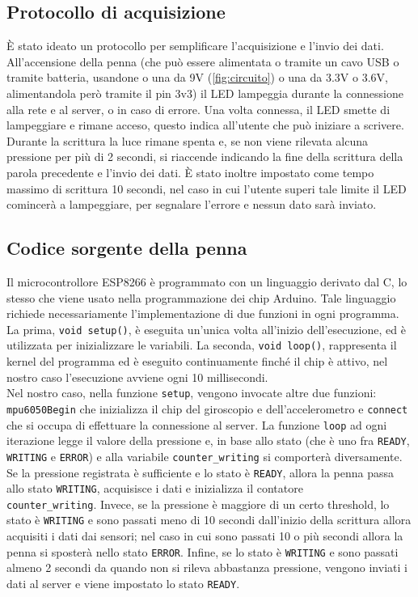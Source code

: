 \documentclass[8pt,notitlepage]{report}
\begin{document}
		\subsection{Protocollo di acquisizione}
			È stato ideato un protocollo per semplificare l'acquisizione e l'invio dei dati. All'accensione della penna (che può essere alimentata o tramite un cavo USB o tramite batteria, usandone o una da 9V (\cref{fig:circuito}) o una da 3.3V o 3.6V, alimentandola però tramite il pin 3v3) il LED lampeggia durante la connessione alla rete e al server, o in caso di errore. Una volta connessa, il LED smette di lampeggiare e rimane acceso, questo indica all'utente che può iniziare a scrivere. Durante la scrittura la luce rimane spenta e, se non viene rilevata alcuna pressione per più di 2 secondi, si riaccende indicando la fine della scrittura della parola precedente e l'invio dei dati. È stato inoltre impostato come tempo massimo di scrittura 10 secondi, nel caso in cui l'utente superi tale limite il LED comincerà a lampeggiare, per segnalare l'errore e nessun dato sarà inviato.
		
		\subsection{Codice sorgente della penna}
			Il microcontrollore ESP8266 è programmato con un linguaggio derivato dal C, lo stesso che viene usato nella programmazione dei chip Arduino. Tale linguaggio richiede necessariamente l'implementazione di due funzioni in ogni programma. \\
			La prima, \verb|void setup()|, è eseguita un'unica volta all'inizio dell'esecuzione, ed è utilizzata per inizializzare le variabili. La seconda, \verb|void loop()|, rappresenta il kernel del programma ed è eseguito continuamente finché il chip è attivo, nel nostro caso l'esecuzione avviene ogni 10 millisecondi. \\
			Nel nostro caso, nella funzione \verb|setup|, vengono invocate altre due funzioni: \verb|mpu6050Begin| che inizializza il chip del giroscopio e dell'accelerometro e \verb|connect| che si occupa di effettuare la connessione al server. La funzione \verb|loop| ad ogni iterazione legge il valore della pressione e, in base allo stato (che è uno fra \verb|READY|, \verb|WRITING| e \verb|ERROR|) e alla variabile \verb|counter_writing| si comporterà diversamente. \\ Se la pressione registrata è sufficiente e lo stato è \verb|READY|, allora la penna passa allo stato \verb|WRITING|, acquisisce i dati e inizializza il contatore \\ \verb|counter_writing|. Invece, se la pressione è maggiore di un certo threshold, lo stato è \verb|WRITING| e sono passati meno di 10 secondi dall'inizio della scrittura allora acquisiti i dati dai sensori; nel caso in cui sono passati 10 o più secondi allora la penna si sposterà nello stato \verb|ERROR|. Infine, se lo stato è \verb|WRITING| e sono passati almeno 2 secondi da quando non si rileva abbastanza pressione, vengono inviati i dati al server e viene impostato lo stato \verb|READY|. 
			
\end{document}
